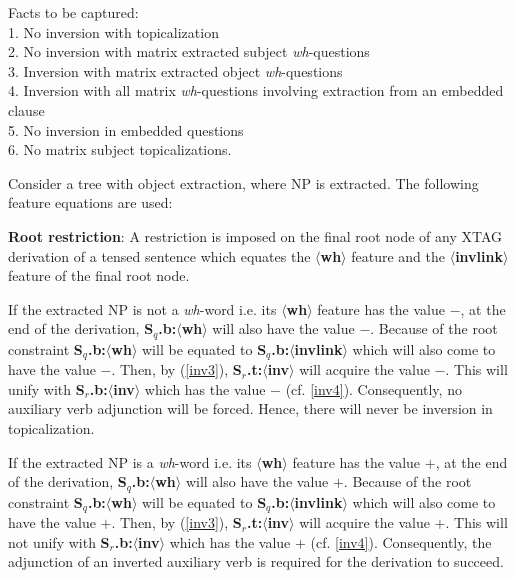 Facts to be captured:\\
1. No inversion with topicalization\\
2. No inversion with matrix extracted subject {\em wh}-questions\\
3. Inversion with matrix extracted object {\em wh}-questions\\
4. Inversion with all matrix {\em wh}-questions involving extraction from an
embedded clause\\
5. No inversion in embedded questions \\
6. No matrix subject topicalizations.

Consider a tree with object extraction, where NP is extracted. 
The following feature equations are used:\\


{\bf Root restriction}: A restriction is imposed on the final root
node of any XTAG derivation of a tensed sentence which equates the
{\bf $\langle$wh$\rangle$} feature and the {\bf
$\langle$invlink$\rangle$} feature of the final root node.

If the extracted NP is not a {\em wh}-word i.e. its {\bf
$\langle$wh$\rangle$} feature has the value $-$, at the end of the
derivation, {\bf S$_{q}$.b:$\langle$wh$\rangle$} will also have the
value $-$. Because of the root constraint {\bf
S$_{q}$.b:$\langle$wh$\rangle$} will be equated to {\bf
S$_{q}$.b:$\langle$invlink$\rangle$} which will also come to have the
value $-$. Then, by (\ref{inv3}), {\bf
S$_{r}$.t:$\langle$inv$\rangle$} will acquire the value $-$. This will
unify with {\bf S$_{r}$.b:$\langle$inv$\rangle$} which has the value
$-$ (cf. \ref{inv4}). Consequently, no auxiliary verb adjunction will
be forced. Hence, there will never be inversion in topicalization.

If the extracted NP is a {\em wh}-word i.e. its {\bf $\langle$wh$\rangle$} 
feature has the value $+$, at the end of the derivation, 
{\bf S$_{q}$.b:$\langle$wh$\rangle$} will also have the value $+$. Because of
the root constraint {\bf S$_{q}$.b:$\langle$wh$\rangle$} will be equated 
to {\bf S$_{q}$.b:$\langle$invlink$\rangle$} which will also come to have
the value $+$. Then, by (\ref{inv3}), {\bf S$_{r}$.t:$\langle$inv$\rangle$} 
will acquire the value $+$. This will not unify with {\bf S$_{r}$.b:$\langle$inv$\rangle$}
which has the value $+$ (cf. \ref{inv4}). Consequently, the adjunction
of an inverted auxiliary verb is required for the derivation to succeed.

